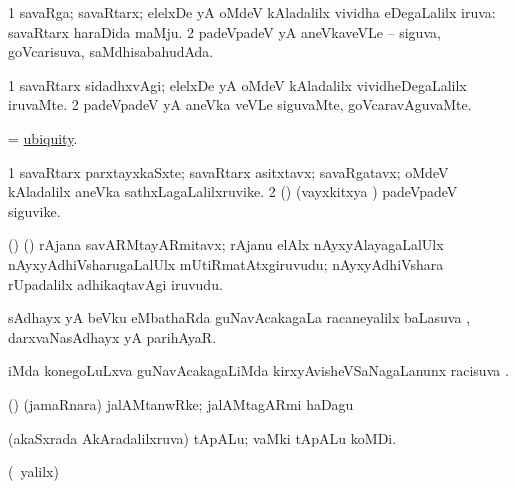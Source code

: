 \bentry
{} 
\gl{\gu}
\expl{}
\bmng
\bnum
\num{1} savaRga; savaRtarx; elelxDe yA oMdeV kAladalilx vividha eDegaLalilx iruva:  savaRtarx haraDida maMju. 
\num{2} padeVpadeV yA aneVkaveVLe -- siguva, goVcarisuva, saMdhisabahudAda. 
\enum
\emng
\eentry

\bentry
{} 
\gl{\kirxvi}
\expl{}
\bmng
\bnum
\num{1} savaRtarx sidadhxvAgi; elelxDe yA oMdeV kAladalilx vividheDegaLalilx iruvaMte. 
\num{2} padeVpadeV yA aneVka veVLe siguvaMte, goVcaravAguvaMte. 
\enum
\emng
\eentry

\bentry
{} 
\gl{\nA}
\expl{}
\bmng
= \hyperlink{ubiquity}{ubiquity}. 
\emng
\eentry

\bentry
{} 
\gl{\nA}
\expl{}
\bmng
\bnum
\num{1} savaRtarx parxtayxkaSxte; savaRtarx asitxtavx; savaRgatavx; oMdeV kAladalilx aneVka sathxLagaLalilxruvike. 
\num{2} (\hA) (vayxkitxya \vi) padeVpadeV siguvike. 
\enum
\emng

\noindent
\gl{\pagu}
\expl{}
\bmng
{} (\birx) (\nAyxshA) rAjana savARMtayARmitavx; rAjanu elAlx nAyxyAlayagaLalUlx nAyxyAdhiVsharugaLalUlx mUtiRmatAtxgiruvudu; nAyxyAdhiVshara rUpadalilx adhikaqtavAgi iruvudu. 
\emng
\eentry

\bentry
{}
\gl{\uparx}
\bmng
sAdhayx yA beVku eMbathaRda guNavAcakagaLa racaneyalilx baLasuva \uparx, \udA\  darxvaNasAdhayx yA parihAyaR. 
\emng
\eentry

\bentry
{} 
\gl{\uparx}
\expl{}
\bmng
{} iMda konegoLuLxva guNavAcakagaLiMda kirxyAvisheVSaNagaLanunx racisuva \uparx. 
\emng
\eentry

\bentry
{} 
\gl{\nA}
\bmng
 (\ca) (jamaRnara) jalAMtanwRke; jalAMtagARmi haDagu 
\emng
\eentry

\bentry
{} 
\gl{\nA}
\expl{}
\bmng
{} (akaSxrada AkAradalilxruva) tApALu; vaMki tApALu koMDi. 
\emng
\eentry

\bentry
{}
\gl{\saMkiSx}
\expl{}
\bmng
{} 
\emng
\eentry

\bentry
{}
\gl{\saMkiSx}
\expl{}
\bmng
{} 
\emng
\eentry

\bentry
{}
\gl{\saMkiSx}
\expl{}
\bmng
(\UK\ yalilx)  
\emng
\eentry

